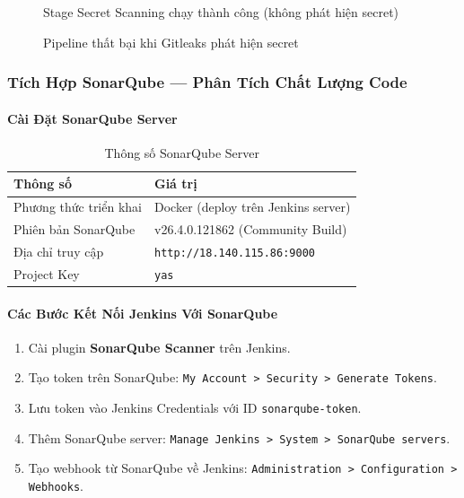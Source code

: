 \begin{figure}[H]
\centering
{}
\caption{Stage Secret Scanning chạy thành công (không phát hiện secret)}
\end{figure}

\begin{figure}[H]
\centering
{}
\caption{Pipeline thất bại khi Gitleaks phát hiện secret}
\end{figure}

\subsubsection{Tích Hợp SonarQube --- Phân Tích Chất Lượng Code}

\paragraph{Cài Đặt SonarQube Server}

\begin{table}[H]
\centering
\caption{Thông số SonarQube Server}
\begin{tabular}{|l|l|}
\hline
\textbf{Thông số} & \textbf{Giá trị} \\
\hline
Phương thức triển khai & Docker (deploy trên Jenkins server) \\
\hline
Phiên bản SonarQube & v26.4.0.121862 (Community Build) \\
\hline
Địa chỉ truy cập & \texttt{http://18.140.115.86:9000} \\
\hline
Project Key & \texttt{yas} \\
\hline
\end{tabular}
\end{table}

\paragraph{Các Bước Kết Nối Jenkins Với SonarQube}

\begin{enumerate}
    \item Cài plugin \textbf{SonarQube Scanner} trên Jenkins.
    \item Tạo token trên SonarQube: \texttt{My Account > Security > Generate Tokens}.
    \item Lưu token vào Jenkins Credentials với ID \texttt{sonarqube-token}.
    \item Thêm SonarQube server: \texttt{Manage Jenkins > System > SonarQube servers}.
    \item Tạo webhook từ SonarQube về Jenkins: \texttt{Administration > Configuration > Webhooks}.
\end{enumerate}


